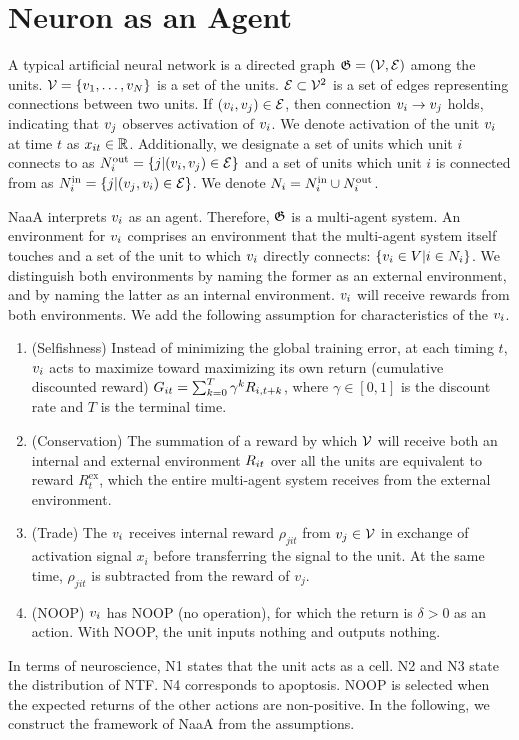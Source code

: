 \section{Neuron as an Agent}

A typical artificial neural network is a directed graph $\mathfrak{G} = (\mathcal{V}, \mathcal{E})$ among the units.
$\mathcal{V} = \{v_{1}, \dots, v_{N}\}$ is a set of the units. $\mathcal{E} \subset \mathcal{V}^2$ is a set of edges representing connections between two units.
If $(v_{i}, v_{j}) \in \mathcal{E}$, then connection $v_{i} \rightarrow v_{j}$ holds, indicating that $v_{j}$ observes activation of $v_{i}$.
We denote activation of the unit $v_{i}$ at time $t$ as $x_{it} \in \mathbb{R}$.
Additionally, we designate a set of units which unit $i$ connects to as $N^\mathrm{out}_i = \{j | (v_{i}, v_{j}) \in \mathcal{E} \}$ and a set of units which unit $i$ is connected from as $N^\mathrm{in}_i = \{j | (v_{j}, v_{i}) \in \mathcal{E} \}$.
We denote $N_i = N^\mathrm{in}_i \cup N^\mathrm{out}_i$.

NaaA interprets $v_{i}$ as an agent.
Therefore, $\mathfrak{G}$ is a multi-agent system.
An environment for $v_{i}$ comprises an environment that the multi-agent system itself touches and a 
set of the unit to which $v_{i}$ directly connects: $\{v_i \in V | i \in N_i\}$.
We distinguish both environments by naming the former as an external environment, and by naming the latter as an internal environment.
$v_{i}$ will receive rewards from both environments.
We add the following assumption for characteristics of the $v_{i}$.
\begin{enumerate}
\renewcommand{\labelenumi}{N\arabic{enumi}:}
\item (Selfishness) 
	Instead of minimizing the global training error,
	at each timing $t$, $v_{i}$ acts to maximize toward maximizing its own return (cumulative discounted reward)
	$G_{it} = \sum_{k=0}^T \gamma^k R_{i,t+k}$, where $\gamma \in [0, 1]$ is the discount rate and $T$ is the terminal time.
\item (Conservation) 
	The summation of a reward by which $\mathcal{V}$ will receive both an internal and external environment $R_{it}$ over 
	all the units are equivalent to reward $R_t^{\mathrm{ex}}$, which the entire multi-agent system receives from 
	the external environment.
\item (Trade) 
	The $v_{i}$ receives internal reward $\rho_{jit}$ from $v_{j} \in \mathcal{V}$ in exchange of activation signal $x_i$
	before transferring the signal to the unit. At the same time, $\rho_{jit}$ is subtracted from the reward of $v_j$.
\item (NOOP) 
	$v_{i}$ has NOOP (no operation), for which the return is $\delta > 0$ as an action.
	With NOOP, the unit inputs nothing and outputs nothing.
\end{enumerate}
In terms of neuroscience,
N1 states that the unit acts as a cell.
N2 and N3 state the distribution of NTF. N4 corresponds to apoptosis.
NOOP is selected when the expected returns of the other actions are non-positive.
In the following, we construct the framework of NaaA from the assumptions.

